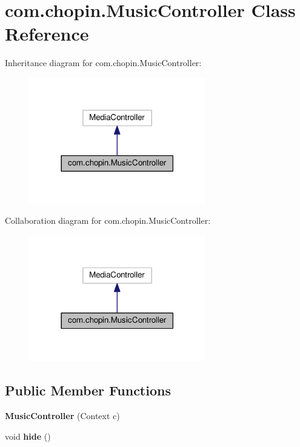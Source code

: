 \hypertarget{classcom_1_1chopin_1_1MusicController}{}\section{com.\+chopin.\+Music\+Controller Class Reference}
\label{classcom_1_1chopin_1_1MusicController}


Inheritance diagram for com.\+chopin.\+Music\+Controller\+:
\nopagebreak
\begin{figure}[H]
\begin{center}
\leavevmode
\includegraphics[width=218pt]{classcom_1_1chopin_1_1MusicController__inherit__graph}
\end{center}
\end{figure}


Collaboration diagram for com.\+chopin.\+Music\+Controller\+:
\nopagebreak
\begin{figure}[H]
\begin{center}
\leavevmode
\includegraphics[width=218pt]{classcom_1_1chopin_1_1MusicController__coll__graph}
\end{center}
\end{figure}
\subsection*{Public Member Functions}
\begin{DoxyCompactItemize}
\item 
\hypertarget{classcom_1_1chopin_1_1MusicController_a3f68f15cba5ad8a85ee59b54501f1e84}{}{\bfseries Music\+Controller} (Context c)\label{classcom_1_1chopin_1_1MusicController_a3f68f15cba5ad8a85ee59b54501f1e84}

\item 
\hypertarget{classcom_1_1chopin_1_1MusicController_ae50a2139682ad573643ddfd21aee6a54}{}void {\bfseries hide} ()\label{classcom_1_1chopin_1_1MusicController_ae50a2139682ad573643ddfd21aee6a54}

\end{DoxyCompactItemize}


